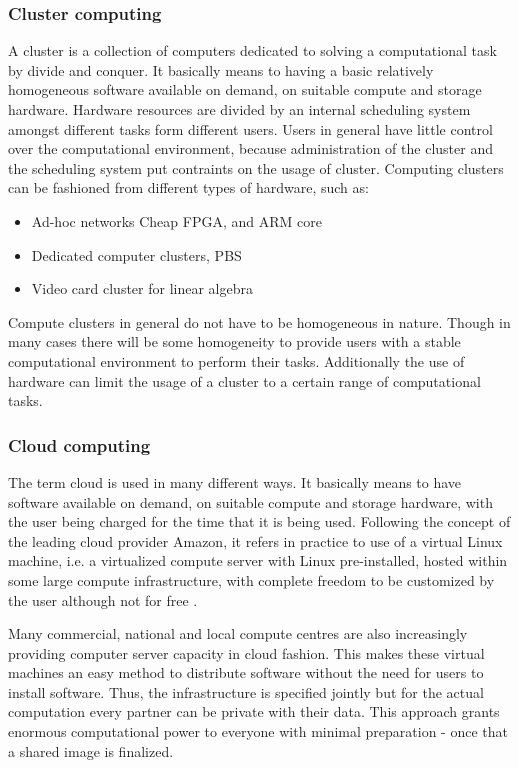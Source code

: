 \subsubsection*{Cluster computing}
A cluster is a collection of computers dedicated to solving a computational task by divide 
and conquer. It basically means to having a basic relatively homogeneous software available 
on demand, on suitable compute and storage hardware. Hardware resources are divided by an 
internal scheduling system amongst different tasks form different users. Users in general 
have little control over the computational environment, because administration of the cluster 
and the scheduling system put contraints on the usage of cluster. Computing clusters can be 
fashioned from different types of hardware, such as:
\begin{itemize}
  \item Ad-hoc networks Cheap FPGA, and ARM core
  \item Dedicated computer clusters, PBS
  \item Video card cluster for linear algebra
\end{itemize}
Compute clusters in general do not have to be homogeneous in nature. Though in many cases 
there will be some homogeneity to provide users with a stable computational environment to 
perform their tasks. Additionally the use of hardware can limit the usage of a cluster to a 
certain range of computational tasks.

\subsubsection*{Cloud computing}
The term cloud is used in many different ways. It basically means to have software available 
on demand, on suitable compute and storage hardware, with the user being charged for the time 
that it is being used. Following the concept of the leading cloud provider Amazon, it refers 
in practice to use of a virtual Linux machine, i.e. a virtualized compute server with Linux 
pre-installed, hosted within some large compute infrastructure, with complete freedom to be 
customized by the user although not for free \cite{Trelles:2011}.

Many commercial, national and local compute centres are also increasingly providing computer
server capacity in cloud fashion. This makes these virtual machines an easy method to distribute 
software without the need for users to install software. Thus, the infrastructure is specified
jointly but for the actual computation every partner can be private with their data. This 
approach grants enormous computational power to everyone with minimal preparation - once that 
a shared image is finalized.

